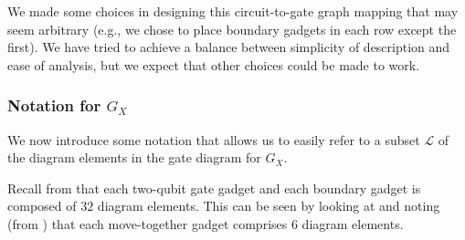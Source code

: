\documentclass[../thesis-main/thesis-main]{subfiles}
\begin{document}
%

We made some choices in designing this circuit-to-gate graph mapping that may seem arbitrary (e.g., we chose to place boundary gadgets in each row except the first). We have tried to achieve a balance between simplicity of description and ease of analysis, but we expect that other choices could be made to work.

\subsubsection{Notation for $G_X$}

We now introduce some notation that allows us to easily refer to a subset $\mathcal{L}$ of the diagram elements in the gate diagram for $G_X$.

Recall from  that each two-qubit gate gadget and each boundary gadget is composed of $32$ diagram elements. This can be seen by looking at  and noting (from ) that each move-together gadget comprises 6 diagram elements.
\end{document}
